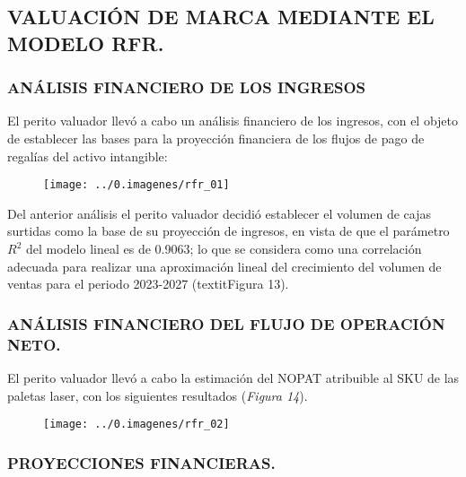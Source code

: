 \begin{leftcolumn}


\subsection{VALUACIÓN  DE MARCA MEDIANTE EL MODELO RFR.}

\subsubsection{ANÁLISIS FINANCIERO DE LOS INGRESOS}

El perito valuador llevó a cabo un análisis financiero de los ingresos, con el objeto de establecer las bases para la proyección financiera de los flujos de pago de regalías del activo intangible:\\

\begin{figure}
\centering
\texttt{[image: ../0.imagenes/rfr\_01]}
\end{figure}

Del anterior análisis el perito valuador decidió establecer el volumen de cajas surtidas como la base de su proyección de ingresos, en vista de que el parámetro $R^2$ del modelo lineal es de 0.9063; lo que se considera como una correlación adecuada para realizar una aproximación lineal del crecimiento del volumen de ventas para el periodo 2023-2027 (\textcolor{principal}{textit{Figura 13}}).

\subsubsection{ANÁLISIS FINANCIERO DEL FLUJO DE OPERACIÓN NETO.}

El perito valuador llevó a cabo la estimación del NOPAT atribuible al SKU de las paletas laser, con los siguientes resultados (\textcolor{principal}{\textit{Figura 14}}).

\begin{figure}
\centering
\texttt{[image: ../0.imagenes/rfr\_02]}
\end{figure}

\subsubsection{PROYECCIONES FINANCIERAS.}


\end{leftcolumn}
